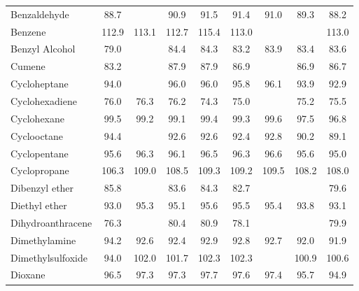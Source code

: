 \begin{longtable}{m{3.1cm} | c c c c c c c c}
Benzaldehyde                     &  88.7     &          &   90.9   &    91.5     &    91.4    &   91.0   &  89.3   &    88.2   \\
Benzene                          & 112.9     &  113.1   &  112.7   &   115.4     &   113.0    &          &         &   113.0   \\
Benzyl Alcohol                   &  79.0     &          &   84.4   &    84.3     &    83.2    &   83.9   &  83.4   &    83.6   \\
Cumene                           &  83.2     &          &   87.9   &    87.9     &    86.9    &          &  86.9   &    86.7   \\
Cycloheptane                     &  94.0     &          &   96.0   &    96.0     &    95.8    &   96.1   &  93.9   &    92.9   \\
Cyclohexadiene                   &  76.0     &   76.3   &   76.2   &    74.3     &    75.0    &          &  75.2   &    75.5   \\
Cyclohexane                      &  99.5     &   99.2   &   99.1   &    99.4     &    99.3    &   99.6   &  97.5   &    96.8   \\
Cyclooctane                      &  94.4     &          &   92.6   &    92.6     &    92.4    &   92.8   &  90.2   &    89.1   \\
Cyclopentane                     &  95.6     &   96.3   &   96.1   &    96.5     &    96.3    &   96.6   &  95.6   &    95.0   \\
Cyclopropane                     & 106.3     &  109.0   &  108.5   &   109.3     &   109.2    &  109.5   & 108.2   &   108.0   \\
Dibenzyl ether                   &  85.8     &          &   83.6   &    84.3     &    82.7    &          &         &    79.6   \\
Diethyl ether                    &  93.0     &   95.3   &   95.1   &    95.6     &    95.5    &   95.4   &  93.8   &    93.1   \\
Dihydroanthracene                &  76.3     &          &   80.4   &    80.9     &    78.1    &          &         &    79.9   \\
Dimethylamine                    &  94.2     &   92.6   &   92.4   &    92.9     &    92.8    &   92.7   &  92.0   &    91.9   \\
Dimethylsulfoxide                &  94.0     &  102.0   &  101.7   &   102.3     &   102.3    &          & 100.9   &   100.6   \\
Dioxane                          &  96.5     &   97.3   &   97.3   &    97.7     &    97.6    &   97.4   &  95.7   &    94.9   \\

\end{longtable}
